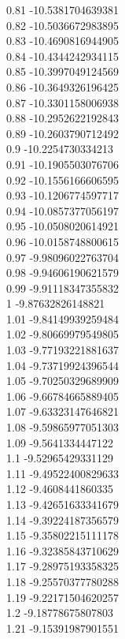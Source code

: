 {0.81	-10.5381704639381\\
0.82	-10.5036672983895\\
0.83	-10.4690816944905\\
0.84	-10.4344242934115\\
0.85	-10.3997049124569\\
0.86	-10.3649326196425\\
0.87	-10.3301158006938\\
0.88	-10.2952622192843\\
0.89	-10.2603790712492\\
0.9	-10.2254730334213\\
0.91	-10.1905503076706\\
0.92	-10.1556166606595\\
0.93	-10.1206774597717\\
0.94	-10.0857377056197\\
0.95	-10.0508020614921\\
0.96	-10.0158748800615\\
0.97	-9.98096022763704\\
0.98	-9.94606190621579\\
0.99	-9.91118347355832\\
1	-9.87632826148821\\
1.01	-9.84149939259484\\
1.02	-9.80669979549805\\
1.03	-9.77193221881637\\
1.04	-9.73719924396544\\
1.05	-9.70250329689909\\
1.06	-9.66784665889405\\
1.07	-9.63323147646821\\
1.08	-9.59865977051303\\
1.09	-9.5641334447122\\
1.1	-9.52965429331129\\
1.11	-9.49522400829633\\
1.12	-9.4608441860335\\
1.13	-9.42651633341679\\
1.14	-9.39224187356579\\
1.15	-9.35802215111178\\
1.16	-9.32385843710629\\
1.17	-9.28975193358325\\
1.18	-9.25570377780288\\
1.19	-9.22171504620257\\
1.2	-9.18778675807803\\
1.21	-9.15391987901551\\
}
